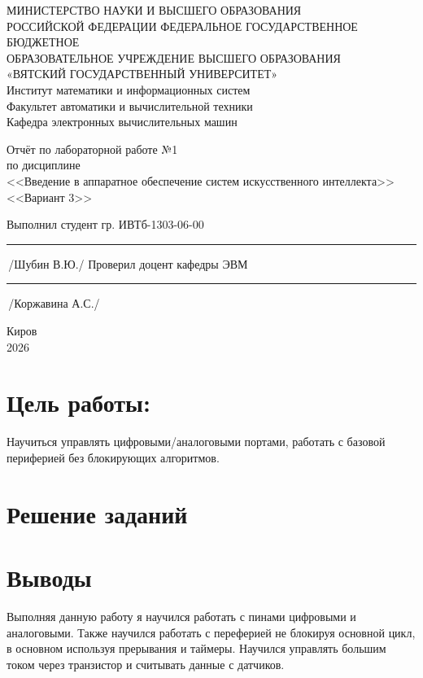 \documentclass[oneside,a4paper,14pt]{extarticle} %
\begin{document}
	\newpage\thispagestyle{empty}
	\begin{center}
		МИНИСТЕРСТВО НАУКИ И ВЫСШЕГО ОБРАЗОВАНИЯ\\
		РОССИЙСКОЙ ФЕДЕРАЦИИ
		ФЕДЕРАЛЬНОЕ ГОСУДАРСТВЕННОЕ БЮДЖЕТНОЕ\\
		ОБРАЗОВАТЕЛЬНОЕ
		УЧРЕЖДЕНИЕ ВЫСШЕГО ОБРАЗОВАНИЯ\\
		«ВЯТСКИЙ ГОСУДАРСТВЕННЫЙ УНИВЕРСИТЕТ»\\
		Институт математики и информационных систем\\
		Факультет автоматики и вычислительной техники\\
		Кафедра электронных вычислительных машин
	\end{center}
	\vspace{20mm}
	
	\begin{center}
		Отчёт по лабораторной работе №1\\
		по дисциплине\\
		<<Введение в аппаратное обеспечение систем искусственного интеллекта>>\\
		<<Вариант 3>>\\
	\end{center}
	\vspace{48mm}
	
	\noindent
	Выполнил студент гр. ИВТб-1303-06-00 \hfill \rule[-0,5mm]{30mm}{0.15mm}\,/Шубин В.Ю./
	\newline
	Проверил доцент кафедры ЭВМ \hfill \rule[-0,5mm]{30mm}{0.15mm}\,/Коржавина А.С./
	
	\vfill
	\begin{center}
		Киров\\
		2026
	\end{center}
	
	\newpage
	\thispagestyle{empty}
	
	\section*{Цель работы:} Научиться управлять цифровыми/аналоговыми портами, работать с базовой периферией без блокирующих алгоритмов.
	\section*{Решение заданий}
	
	\section*{Выводы} Выполняя данную работу я научился работать с пинами цифровыми и аналоговыми. Также научился работать с переферией не блокируя основной цикл, в основном используя прерывания и таймеры. Научился управлять большим током через транзистор и считывать данные с датчиков.
\end{document}
